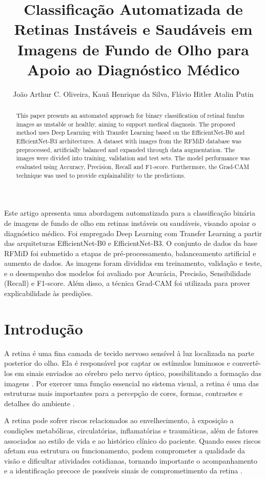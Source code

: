 \documentclass[12pt]{article}
\title{Classificação Automatizada de Retinas Instáveis e Saudáveis em Imagens de Fundo de Olho para Apoio ao Diagnóstico Médico}
\author{João Arthur C. Oliveira\inst{1}, Kauã Henrique da Silva\inst{1}, Flávio Hitler Atalin Putin\inst{1}}
\begin{document}
\maketitle

\begin{abstract}
  This paper presents an automated approach for binary classification of retinal
  fundus images as unstable or healthy, aiming to support medical diagnosis.
  The proposed method uses Deep Learning with Transfer Learning based on the
  EfficientNet-B0 and EfficientNet-B3 architectures. A dataset with images from the RFMiD database was
  preprocessed, artificially balanced and expanded through data augmentation. The images were divided
  into training, validation and test sets. The model performance was
  evaluated using Accuracy, Precision, Recall and F1-score. Furthermore, the Grad-CAM technique was used to provide explainability to the predictions.
\end{abstract}

\begin{resumo}
  Este artigo apresenta uma abordagem automatizada para a classificação binária
  de imagens de fundo de olho em retinas instáveis ou saudáveis, visando apoiar
  o diagnóstico médico. Foi empregado Deep Learning com Transfer Learning a
  partir das arquiteturas EfficientNet-B0 e EfficientNet-B3. O conjunto de dados da base RFMiD 
  foi submetido a etapas de pré-processamento, balanceamento artificial e aumento de
  dados. As imagens foram divididas em treinamento, validação e teste, e o
  desempenho dos modelos foi avaliado por Acurácia, Precisão, Sensibilidade (Recall) e F1-score. Além disso, a técnica Grad-CAM foi utilizada para prover explicabilidade às predições.
\end{resumo}

\section{Introdução}

A retina é uma fina camada de tecido nervoso sensível à luz localizada na parte
posterior do olho. Ela é responsável por captar os estímulos luminosos e
convertê-los em sinais enviados ao cérebro pelo nervo óptico, possibilitando a
formação das imagens \cite{Nguyen2019Retina}. Por exercer uma função essencial no sistema visual, a
retina é uma das estruturas mais importantes para a percepção de cores,
formas, contrastes e detalhes do ambiente \cite{Atchison2023Optics}.

A retina pode sofrer riscos relacionados ao envelhecimento, à exposição a
condições metabólicas, circulatórias, inflamatórias e traumáticas, além de
fatores associados ao estilo de vida e ao histórico clínico do paciente. Quando
esses riscos afetam sua estrutura ou funcionamento, podem comprometer a
qualidade da visão e dificultar atividades cotidianas, tornando importante o
acompanhamento e a identificação precoce de possíveis sinais de comprometimento da retina \cite{Weber2020Retinal}.
\end{document}
